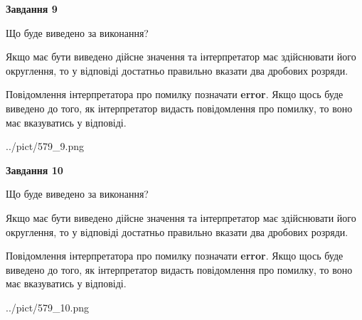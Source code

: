 \documentclass[12pt, ukrainian]{article}
\begin{document}
{\begin {Large}
{\begin {center}\textbf{Завдання 9}\end {center}}\par
Що буде виведено за виконання? \par

Якщо має бути виведено дійсне значення та інтерпретатор має здійснювати його округлення, 
то у відповіді достатньо правильно вказати два дробових розряди.

Повідомлення інтерпретатора про помилку позначати \textbf{error}.
Якщо щось буде виведено до того, як інтерпретатор видасть повідомлення про помилку, 
то воно має вказуватись у відповіді. \par

\begin{center}
	{../pict/579_9.png}
\end{center}
\newpage

{\begin {center}\textbf{Завдання 10}\end {center}}\par
Що буде виведено за виконання? \par

Якщо має бути виведено дійсне значення та інтерпретатор має здійснювати його округлення, 
то у відповіді достатньо правильно вказати два дробових розряди.

Повідомлення інтерпретатора про помилку позначати \textbf{error}.
Якщо щось буде виведено до того, як інтерпретатор видасть повідомлення про помилку, 
то воно має вказуватись у відповіді. \par

\begin{center}
	{../pict/579_10.png}
\end{center}
\newpage

\end {Large}}
\end{document}
